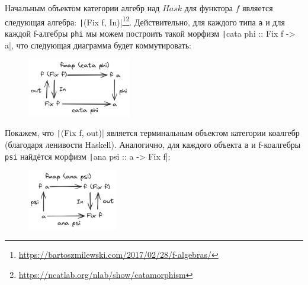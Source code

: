 Начальным объектом категории алгебр над $Hask$ для функтора $f$ является следующая алгебра: \texttt|(Fix f, In)|\footnote{\url{https://bartoszmilewski.com/2017/02/28/f-algebras/}}\footnote{\url{https://ncatlab.org/nlab/show/catamorphism}}. %
Действительно, для каждого типа \texttt{a} и для каждой f-алгебры \texttt{phi} мы можем построить такой морфизм \texttt|cata phi :: Fix f -> a|, что следующая диаграмма будет коммутировать:
\begin{figure}[h!]
    \centering
    \includegraphics[width=0.4\textwidth]{figs/cata}
\end{figure}

Покажем, что \texttt|(Fix f, out)| является терминальным объектом категории коалгебр (благодаря ленивости Haskell). %
Аналогично, для каждого объекта \texttt{a} и f-коалгебры \texttt{psi} найдётся морфизм \texttt|ana psi :: a -> Fix f|:
\begin{figure}[h!]
    \centering
    \includegraphics[width=0.35\textwidth]{figs/ana}
\end{figure}

